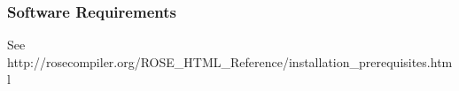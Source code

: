 
\subsubsection{Software Requirements}

See http://rosecompiler.org/ROSE\_HTML\_Reference/installation\_prerequisites.html


